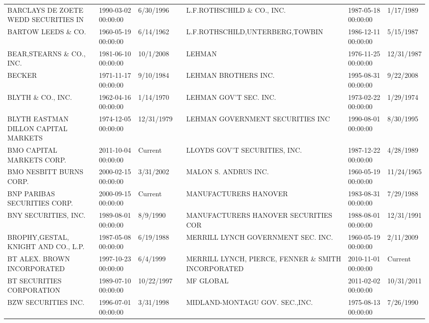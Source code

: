 \documentclass{article}
\begin{document}
\begin{tabular}{lllllll}
BARCLAYS DE ZOETE WEDD SECURITIES IN & 1990-03-02 00:00:00 & 6/30/1996 &  & L.F.ROTHSCHILD \& CO., INC.      & 1987-05-18 00:00:00 & 1/17/1989 \\
BARTOW LEEDS \& CO.                   & 1960-05-19 00:00:00 & 6/14/1962 &  & L.F.ROTHSCHILD,UNTERBERG,TOWBIN & 1986-12-11 00:00:00 & 5/15/1987 \\
BEAR,STEARNS \& CO., INC.            & 1981-06-10 00:00:00 & 10/1/2008 &  & LEHMAN                               & 1976-11-25 00:00:00 & 12/31/1987 \\
BECKER                               & 1971-11-17 00:00:00 & 9/10/1984 &  & LEHMAN BROTHERS INC.                 & 1995-08-31 00:00:00 & 9/22/2008 \\
BLYTH \& CO., INC.                    & 1962-04-16 00:00:00 & 1/14/1970 &  & LEHMAN GOV'T SEC. INC.               & 1973-02-22 00:00:00 & 1/29/1974 \\
BLYTH EASTMAN DILLON CAPITAL MARKETS & 1974-12-05 00:00:00 & 12/31/1979 &  & LEHMAN GOVERNMENT SECURITIES INC     & 1990-08-01 00:00:00 & 8/30/1995 \\
BMO CAPITAL MARKETS CORP.  & 2011-10-04 00:00:00 & Current &  & LLOYDS GOV'T SECURITIES, INC.       & 1987-12-22 00:00:00 & 4/28/1989 \\
BMO NESBITT BURNS CORP.             & 2000-02-15 00:00:00 & 3/31/2002 &  & MALON S. ANDRUS INC.                 & 1960-05-19 00:00:00 & 11/24/1965 \\
BNP PARIBAS SECURITIES CORP.         & 2000-09-15 00:00:00 & Current &  & MANUFACTURERS HANOVER                & 1983-08-31 00:00:00 & 7/29/1988 \\
BNY SECURITIES, INC.                 & 1989-08-01 00:00:00 & 8/9/1990 &  & MANUFACTURERS HANOVER SECURITIES COR & 1988-08-01 00:00:00 & 12/31/1991 \\
BROPHY,GESTAL, KNIGHT AND CO., L.P. & 1987-05-08 00:00:00 & 6/19/1988 &  & MERRILL LYNCH GOVERNMENT SEC. INC.  & 1960-05-19 00:00:00 & 2/11/2009 \\
BT ALEX. BROWN INCORPORATED          & 1997-10-23 00:00:00 & 6/4/1999 &  & MERRILL LYNCH, PIERCE, FENNER \& SMITH INCORPORATED & 2010-11-01 00:00:00 & Current \\
BT SECURITIES CORPORATION            & 1989-07-10 00:00:00 & 10/22/1997 &  & MF GLOBAL  & 2011-02-02 00:00:00 & 10/31/2011 \\
BZW SECURITIES INC.                  & 1996-07-01 00:00:00 & 3/31/1998 &  & MIDLAND-MONTAGU GOV. SEC.,INC.  & 1975-08-13 00:00:00 & 7/26/1990 \\

\end{tabular}
\end{document}
